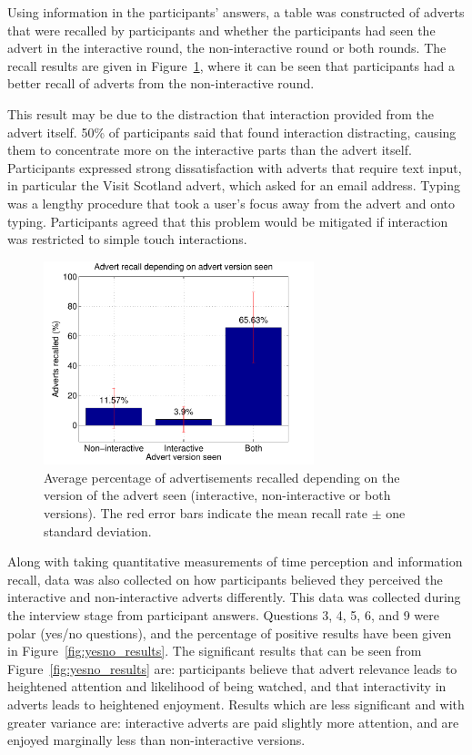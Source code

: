 	Using information in the participants' answers, a table was constructed of adverts that were recalled by participants and whether the participants had seen the advert in the interactive round, the non-interactive round or both rounds. The recall results are given in Figure~\ref{fig:recall}, where it can be seen that participants had a better recall of adverts from the non-interactive round. 

	This result may be due to the distraction that interaction provided from the advert itself. 50\% of participants said that found interaction distracting, causing them to concentrate more on the interactive parts than the advert itself. Participants expressed strong dissatisfaction with adverts that require text input, in particular the Visit Scotland advert, which asked for an email address. Typing was a lengthy procedure that took a user's focus away from the advert and onto typing. Participants agreed that this problem would be mitigated if interaction was restricted to simple touch interactions.

	\begin{figure}[!ht]
		\centering
		\includegraphics[width=0.7\textwidth]{images/recall.pdf}
		\caption{Average percentage of advertisements recalled depending on the version of the advert seen (interactive, non-interactive or both versions). The red error bars indicate the mean recall rate $\pm$ one standard deviation.}
		\label{fig:recall}
	\end{figure}

	Along with taking quantitative measurements of time perception and information recall, data was also collected on how participants believed they perceived the interactive and non-interactive adverts differently. This data was collected during the interview stage from participant answers. Questions 3, 4, 5, 6, and 9 were polar (yes/no questions), and the percentage of positive results have been given in Figure~\ref{fig:yesno_results}. The significant results that can be seen from Figure~\ref{fig:yesno_results} are: participants believe that advert relevance leads to heightened attention and likelihood of being watched, and that interactivity in adverts leads to heightened enjoyment. Results which are less significant and with greater variance are: interactive adverts are paid slightly more attention, and are enjoyed marginally less than non-interactive versions.

